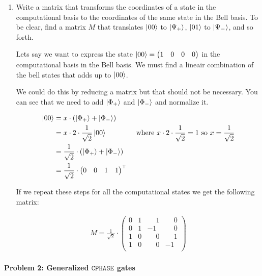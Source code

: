 \documentclass[12pt]{article}
\newcommand{\pmat}[1]{\begin{pmatrix}#1\end{pmatrix}}
\newcommand{\rsqrt}[1]{\ensuremath{\frac{1}{\sqrt{#1}}}}
\newenvironment{answer}{\begingroup\setlength{\leftskip}{-\leftmargin}\begin{framed}}{\end{framed}\endgroup}
\newcommand{\CPHASE}[1]{\ensuremath{\texttt{CPHASE}_{#1}}}
\begin{document}
\begin{enumerate}
    \item Write a matrix that transforms the coordinates of a state in the computational basis to the coordinates of the same state in the Bell basis. To be clear, find a matrix $M$ that translates $\ket{00}$ to $\ket{\Psi_+}$, $\ket{01}$ to $\ket{\Psi_-}$, and so forth.

    \begin{answer}
        Lets say we want to express the state $\ket{00} = \pmat{1 & 0 & 0 & 0}$ in the computational basis in the Bell basis. We must find a lineair combination of the bell states that adds up to $\ket{00}$.

        We could do this by reducing a matrix but that should not be necessary. You can see that we need to add $\ket{\Phi_+}$ and $\ket{\Phi_-}$ and normalize it.

        \begin{alignat*}{2}
              \ket{00}
                &= x \cdot \left(\ket{\Phi_+} + \ket{\Phi_-}\right) && \\
                &= x \cdot 2 \cdot \rsqrt{2}\ket{00} && \text{ where } x \cdot 2 \cdot \rsqrt{2} = 1 \text{ so } x = \rsqrt{2} \\
                &= \rsqrt{2} \cdot \left(\ket{\Phi_+} + \ket{\Phi_-}\right) \\
                &= \rsqrt{2} \cdot \pmat{0 & 0 & 1 & 1}^\top \\
        \end{alignat*}

        If we repeat these steps for all the computational states we get the following matrix:

        \begin{align*}
            M = \rsqrt{2} \cdot \pmat{
                0 & 1 & \phantom{-}1 & \phantom{-}0 \\
                0 & 1 &           -1 & \phantom{-}0 \\
                1 & 0 & \phantom{-}0 & \phantom{-}1 \\
                1 & 0 & \phantom{-}0 &           -1 \\
            }
        \end{align*}
    \end{answer}

\end{enumerate}

\paragraph{Problem 2: Generalized \CPHASE{} gates} \hfill \\
\end{document}
